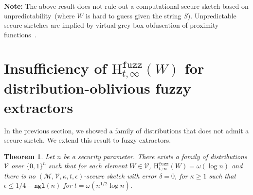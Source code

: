 \documentclass[11pt]{article}
\newcommand{\class}[1]{{\ensuremath{\mathsf{#1}}}}
\newcommand{\sketch}{\ensuremath{\class{SS}}\xspace}
\newcommand{\rec}{\ensuremath{\class{Rec}}\xspace}
\newcommand{\zo}{\ensuremath{\{0, 1\}}}
\newcommand{\ngl}{\ensuremath{\mathtt{ngl}}\xspace}
\newcommand{\Hfuzz}{\mathrm{H}^{\mathtt{fuzz}}_{t,\infty}}
\newtheorem{theorem}{Theorem}[section]
\newtheorem{corollary}[theorem]{Corollary}
\begin{document}

\textbf{Note:} The above result does not rule out a computational secure sketch based on unpredictability~(where $W$ is hard to guess given the string $S$).  Unpredictable secure sketches are implied by virtual-grey box obfuscation of proximity functions~\cite{BitanskyCKP14}.  

\section{Insufficiency of $\Hfuzz(W)$ for distribution-oblivious fuzzy extractors}
\label{sec:imposs fuzz ext}
In the previous section, we showed a family of distributions that does not admit a secure sketch.  We extend this result to fuzzy extractors.  

\begin{theorem}
\label{thm:imposs fuzz ext}
Let $n$ be a security parameter.  There exists a family of distributions $\mathcal{V}$ over $\zo^n$ such that for each element $W\in \mathcal{V}$, $\Hfuzz(W)= \omega(\log n)$ and there is no $(\mathcal{M}, \mathcal{V}, \kappa, t, \epsilon)$-secure sketch with error $\delta = 0$, for $\kappa \ge 1$ such that $\epsilon \le 1/4 - \ngl(n)$ for $t = \omega(n^{1/2}\log n)$. \end{theorem}
\end{document}
